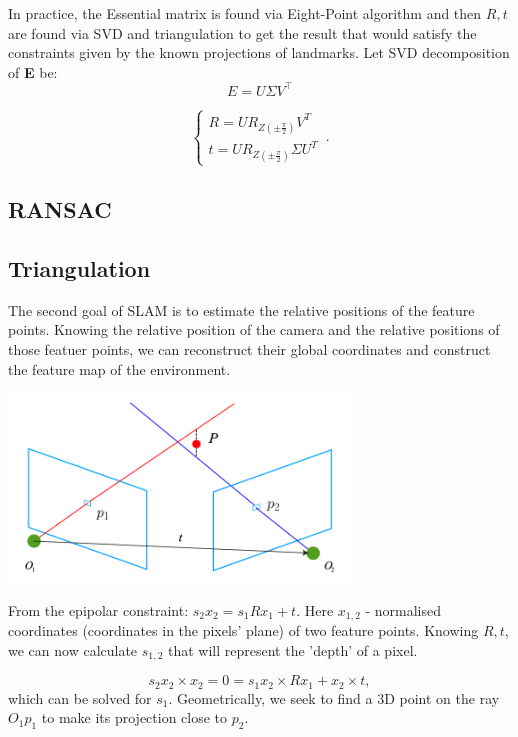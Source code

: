 In practice, the Essential matrix is found via Eight-Point algorithm and then $R, t$ are found via SVD and triangulation to get the result that would satisfy the constraints given by the known projections of landmarks.
Let SVD decomposition of \textbf{E} be:
$$
E = U \Sigma V^\top
$$

\begin{equation}
    \begin{cases}
        R = U R_{Z(\pm  \frac{\pi}{2})} V^{T}\\
        t = U R_{Z(\pm  \frac{\pi}{2})} \Sigma U^{T}
    \end{cases}\,.
\end{equation}

\subsection{RANSAC}


\subsection{Triangulation}

The second goal of SLAM is to estimate the relative positions of the feature points. Knowing the relative position of the camera and the relative positions of those featuer points, we can reconstruct their global coordinates and construct the feature map of the environment. 

\begin{center}
    \includegraphics[height=5cm]{triangulation.png}\\[1cm]
\end{center}

From the epipolar constraint: $s_{2} x_{2} = s_{1} R x_{1} + t$. Here $x_{1, 2}$ - normalised coordinates (coordinates in the pixels' plane) of two feature points. Knowing $R, t$, we can now calculate $s_{1, 2}$ that will represent the 'depth' of a pixel. 

\begin{equation}
    s_{2} x_{2} \times x_{2} = 0 = s_{1} x_{2} \times R x_{1} + x_{2} \times t,
\end{equation}
which can be solved for $s_{1}$. Geometrically, we seek to find a 3D point on the ray $O_{1}p_{1}$ to make its projection close to $p_{2}$.
\pagebreak

